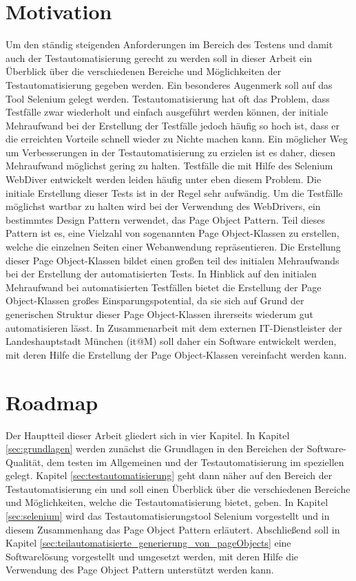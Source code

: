 \section{Motivation}
\label{sec:motivation}
Um den ständig steigenden Anforderungen im Bereich des Testens und damit auch der Testautomatisierung gerecht zu werden soll in dieser Arbeit ein Überblick über die verschiedenen Bereiche und Möglichkeiten der Testautomatisierung gegeben werden. Ein besonderes Augenmerk soll auf das Tool Selenium gelegt werden. 
Testautomatisierung hat oft das Problem, dass Testfälle zwar wiederholt und einfach ausgeführt werden können, der initiale Mehraufwand bei der Erstellung der Testfälle jedoch häufig so hoch ist, dass er die erreichten Vorteile schnell wieder zu Nichte machen kann. Ein möglicher Weg um Verbesserungen in der Testautomatisierung zu erzielen ist es daher, diesen Mehraufwand möglichst gering zu halten.
Testfälle die mit Hilfe des Selenium WebDiver entwickelt werden leiden häufig unter eben diesem Problem. Die initiale Erstellung dieser Tests ist in der Regel sehr aufwändig.
Um die Testfälle möglichst wartbar zu halten wird bei der Verwendung des WebDrivers, ein bestimmtes Design Pattern verwendet, das Page Object Pattern.
Teil dieses Pattern ist es, eine Vielzahl von sogenannten Page Object-Klassen zu erstellen, welche die einzelnen Seiten einer Webanwendung repräsentieren. Die Erstellung dieser Page Object-Klassen bildet einen großen teil des initialen Mehraufwands bei der Erstellung der automatisierten Tests.
In Hinblick auf den initialen Mehraufwand bei automatisierten Testfällen bietet die Erstellung der Page Object-Klassen großes Einsparungspotential, da sie sich auf Grund der generischen Struktur dieser Page Object-Klassen ihrerseits wiederum gut automatisieren lässt.
In Zusammenarbeit mit dem externen IT-Dienstleister der Landeshauptstadt München (it@M) soll daher ein Software entwickelt werden, mit deren Hilfe die Erstellung der Page Object-Klassen vereinfacht werden kann.

\section{Roadmap}
\label{roadmap}
Der Hauptteil dieser Arbeit gliedert sich in vier Kapitel. In Kapitel \ref{sec:grundlagen} werden zunächst die Grundlagen in den Bereichen der Software-Qualität, dem testen im Allgemeinen und der Testautomatisierung im speziellen gelegt.
Kapitel \ref{sec:testautomatisierung} geht dann näher auf den Bereich der Testautomatisierung ein und soll einen Überblick über die verschiedenen Bereiche und Möglichkeiten, welche die Testautomatisierung bietet, geben.
In Kapitel \ref{sec:selenium} wird das Testautomatisierungstool Selenium vorgestellt und in diesem Zusammenhang das Page Object Pattern erläutert.
Abschließend soll in Kapitel \ref{sec:teilautomatisierte_generierung_von_pageObjects} eine Softwarelösung vorgestellt und umgesetzt werden, mit deren Hilfe die Verwendung des Page Object Pattern unterstützt werden kann.

  




